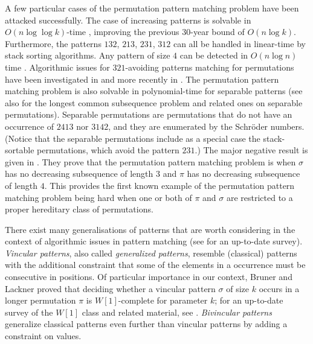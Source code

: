 \documentclass[a4paper]{llncs}
\newcounter{num}
\begin{document}
A few particular cases of the permutation pattern matching problem have been attacked successfully.
The case of  increasing patterns is solvable in
$O(n \log \log k)$-time \cite{Crochemore:Porat:2010},
improving the previous 30-year bound of $O(n \log k)$.
Furthermore, the patterns $132$, $213$, $231$, $312$ can all be handled in linear-time
by stack sorting algorithms.
Any pattern of size $4$ can be detected in $O(n \log n)$ time
\cite{Albert:Aldred:Atkinson:Holton:ISAAC:2001}.
Algorithmic issues for $321$-avoiding patterns matching for permutations have been investigated in
\cite{Guillemot:Vialette:ISAAC:2009} and more recently in \cite{2015arXiv151006051A}.
The permutation pattern matching problem is also solvable in
polynomial-time for separable patterns \cite{Ibarra:1997,Bose:Buss:Lubiw:1998}
(see also \cite{Bouvel:Rossin:Vialette:CPM:2007} for the longest common subsequence problem and
related ones on separable permutations).
Separable permutations are permutations that do not have an occurrence of
$2413$ nor $3142$, and they are enumerated by the Schr{\"o}der numbers.
(Notice that the separable permutations include as a special case the
stack-sortable permutations, which avoid the pattern $231$.)
The major negative result is given in \cite{DBLP:journals/corr/JelinekK16}.
They prove that
the permutation pattern matching problem is \NPC
when $\sigma$ has no decreasing subsequence of length $3$ and
$\pi$ has no decreasing subsequence of length $4$.
This provides the first known example of the permutation pattern matching problem
being hard when one or both of $\pi$ and $\sigma$ are restricted to a proper hereditary
class of permutations.

There exist many generalisations of patterns that are worth considering
in the context of algorithmic issues in pattern matching
(see \cite{Kitaev:book:2011} for an up-to-date survey).
\emph{Vincular patterns}, also called
\emph{generalized patterns},
resemble (classical) patterns with the additional constraint that some of the elements in
a occurrence must be consecutive in positions.
Of particular importance in our context,
Bruner and Lackner \cite{DBLP:journals/corr/abs-1204-5224}
proved that deciding whether a vincular pattern
$\sigma$ of size $k$ occurs in a longer permutation
$\pi$ is $W[1]$-complete for
parameter $k$;
for an up-to-date survey of the $W[1]$ class and related material, see
\cite{Downey:Fellows:2013}.
\emph{Bivincular patterns} generalize classical patterns even further
than vincular
patterns by adding a constraint on values.
\end{document}

